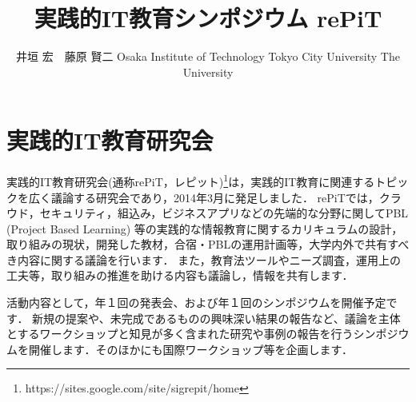 \documentclass[T]{compsoft}
\begin{document}
\title{実践的IT教育シンポジウム rePiT}

%
\author{井垣 宏　藤原 賢二
%
%
%
%
{Osaka Institute of Technology}
{Tokyo City University}
{The University}
}

%
%
%
\maketitle \thispagestyle {empty}




\section{実践的IT教育研究会}
実践的IT教育研究会(通称rePiT，レピット)\footnote{https://sites.google.com/site/sigrepit/home}は，実践的IT教育に関連するトピックを広く議論する研究会であり，2014年3月に発足しました．
rePiTでは，クラウド，セキュリティ，組込み，ビジネスアプリなどの先端的な分野に関してPBL (Project Based Learning) 等の実践的な情報教育に関するカリキュラムの設計，
取り組みの現状，開発した教材，合宿・PBLの運用計画等，大学内外で共有すべき内容に関する議論を行います．
また，教育法ツールやニーズ調査，運用上の工夫等，取り組みの推進を助ける内容も議論し，情報を共有します．

活動内容として，年１回の発表会、および年１回のシンポジウムを開催予定です．
新規の提案や、未完成であるものの興味深い結果の報告など、議論を主体とするワークショップと知見が多く含まれた研究や事例の報告を行うシンポジウムを開催します．そのほかにも国際ワークショップ等を企画します．
\end{document}
